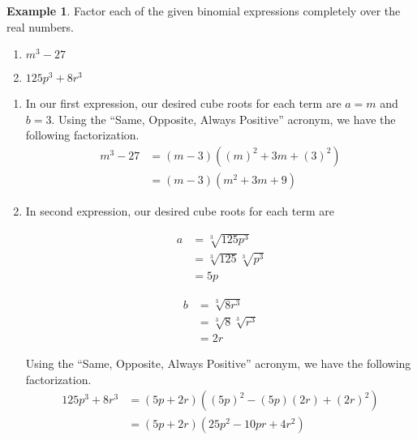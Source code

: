 \documentclass[12pt]{book}
\theoremstyle{definition}
\newtheorem{example}{Example}
\begin{document}
\begin{example} Factor each of the given binomial expressions completely over the real numbers.
  \begin{multicols}{2}
		\begin{enumerate}
			\item $m^3-27$
			\item $125p^3+8r^3$
		\end{enumerate}
	\end{multicols}
	\begin{enumerate}
		\item In our first expression, our desired cube roots for each term are $a=m$ and $b=3$.  Using the ``Same, Opposite, Always Positive'' acronym, we have the following factorization.
		\begin{equation*}
			\begin{split}
				m^3-27&=\left(m-3\right)\left(\left(m\right)^2+3m+\left(3\right)^2\right)\\
				&=\left(m-3\right)\left(m^2+3m+9\right)
			\end{split}
		\end{equation*}
		\item In second expression, our desired cube roots for each term are 
		\begin{multicols}{2}
			\begin{equation*}
				\begin{split}
					a&=\sqrt[3]{125p^3}\\
					 &=\sqrt[3]{125}\sqrt[3]{p^3}\\
					 &=5p
				\end{split}
			\end{equation*}

			\columnbreak

			\begin{equation*}
				\begin{split}
					b&=\sqrt[3]{8r^3}\\
					 &=\sqrt[3]{8}\sqrt[3]{r^3}\\
					 &=2r
				\end{split}
			\end{equation*}
		\end{multicols}
		Using the ``Same, Opposite, Always Positive'' acronym, we have the following factorization.
		\begin{equation*}
			\begin{split}
				125p^3+8r^3&=\left(5p+2r\right)\left(\left(5p\right)^2-\left(5p\right)\left(2r\right)+\left(2r\right)^2\right)\\
				&=\left(5p+2r\right)\left(25p^2-10pr+4r^2\right)
			\end{split}
		\end{equation*}
	\end{enumerate}
\end{example}
\end{document}
